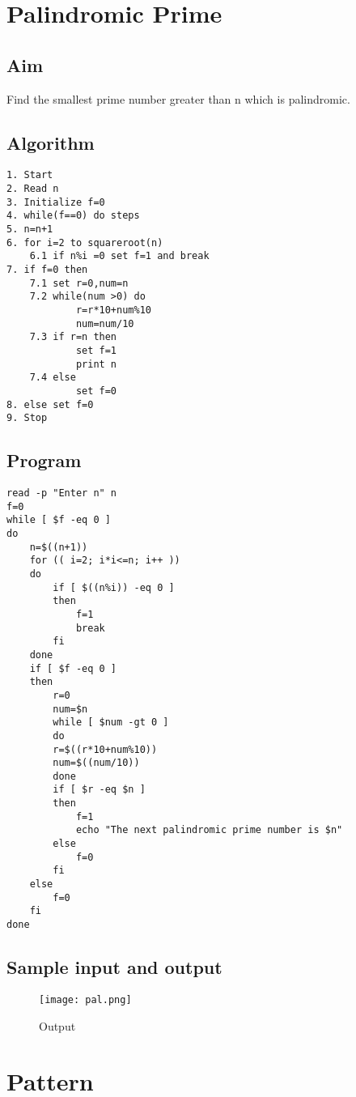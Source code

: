 \documentclass{article}
\begin{document}
\section{\Large Palindromic Prime}
\subsection{Aim}
Find the smallest prime number greater than n which is palindromic.
\subsection{Algorithm}
\begin{Verbatim}[tabsize = 4]
1. Start
2. Read n
3. Initialize f=0
4. while(f==0) do steps
5. n=n+1
6. for i=2 to squareroot(n)
    6.1 if n%i =0 set f=1 and break
7. if f=0 then
    7.1 set r=0,num=n
    7.2 while(num >0) do
            r=r*10+num%10
            num=num/10
    7.3 if r=n then
            set f=1
            print n
    7.4 else
            set f=0
8. else set f=0
9. Stop
\end{Verbatim}
\subsection{Program}
\begin{Verbatim}[tabsize = 4]
read -p "Enter n" n
f=0
while [ $f -eq 0 ]
do
    n=$((n+1))
    for (( i=2; i*i<=n; i++ ))
    do 
        if [ $((n%i)) -eq 0 ]
        then
            f=1
            break
        fi
    done
    if [ $f -eq 0 ]
    then
        r=0
        num=$n
        while [ $num -gt 0 ] 
        do
        r=$((r*10+num%10))
        num=$((num/10))
        done
        if [ $r -eq $n ]
        then
            f=1
            echo "The next palindromic prime number is $n"
        else
            f=0
        fi
    else
        f=0
    fi
done

\end{Verbatim}

\thispagestyle{third}
\subsection{Sample input and output}
\begin{figure}[H]
    \centering
    \texttt{[image: pal.png]}
    \caption{Output}
    \label{fig:my_label2}
\end{figure}
\section{\Large Pattern}
\end{document}
